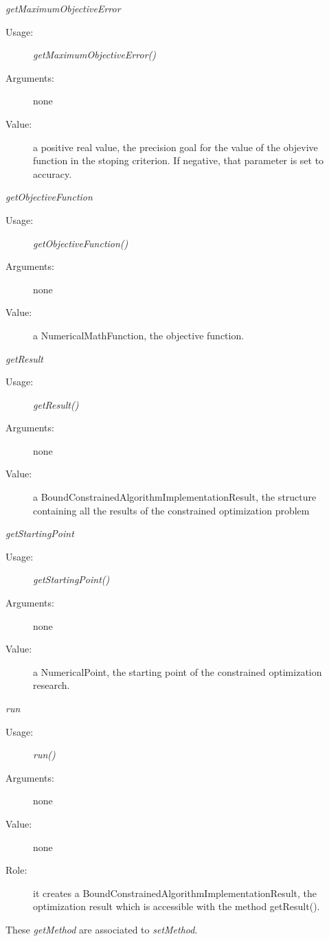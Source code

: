\begin{description}
\begin{description}
  \item \textit{getMaximumObjectiveError}
    \begin{description}
    \item[Usage:] \textit{getMaximumObjectiveError()}
    \item[Arguments:] none
    \item[Value:] a positive real value, the precision goal for the value of the objevive function in the stoping criterion. If negative, that parameter is set to accuracy.
    \end{description}
    \bigskip

  \item \textit{getObjectiveFunction}
    \begin{description}
    \item[Usage:] \textit{getObjectiveFunction()}
    \item[Arguments:] none
    \item[Value:] a NumericalMathFunction, the objective function.
    \end{description}
    \bigskip

  \item \textit{getResult}
    \begin{description}
    \item[Usage:] \textit{getResult()}
    \item[Arguments:] none
    \item[Value:] a BoundConstrainedAlgorithmImplementationResult, the structure containing all the results of the constrained optimization problem
    \end{description}
    \bigskip

  \item \textit{getStartingPoint}
    \begin{description}
    \item[Usage:] \textit{getStartingPoint()}
    \item[Arguments:] none
    \item[Value:] a NumericalPoint, the starting point of the constrained optimization research.
    \end{description}
    \bigskip

  \item \textit{run}
    \begin{description}
    \item[Usage:] \textit{run()}
    \item[Arguments:] none
    \item[Value:] none
    \item[Role:] it creates a BoundConstrainedAlgorithmImplementationResult, the optimization result which is accessible with the method getResult().
    \end{description}


  \end{description}


  These  \textit{getMethod}  are associated to  \textit{setMethod}.


\end{description}



